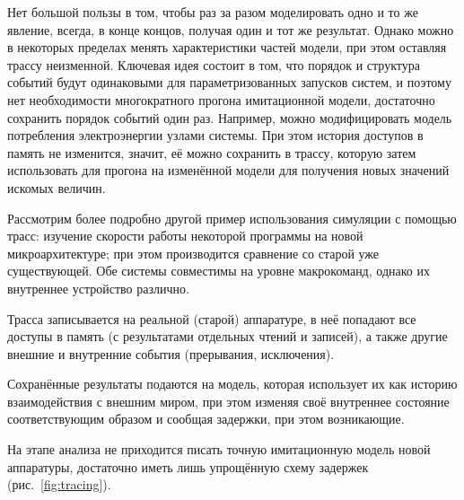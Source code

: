 Нет большой пользы в том, чтобы раз за разом моделировать одно и то же явление, всегда, в конце концов, получая один и тот же результат. Однако можно в некоторых пределах менять характеристики частей модели, при этом оставляя трассу неизменной. Ключевая идея состоит в том, что порядок и структура событий будут одинаковыми для параметризованных запусков систем, и поэтому нет необходимости многократного прогона имитационной модели, достаточно сохранить порядок событий один раз. Например, можно модифицировать модель потребления электроэнергии узлами системы. При этом история доступов в память не изменится, значит, её можно сохранить в трассу, которую затем использовать для прогона на изменённой модели для получения новых значений искомых величин.

Рассмотрим более подробно другой пример использования  симуляции с помощью трасс: изучение скорости работы некоторой программы на новой микроархитектуре; при этом производится сравнение со старой уже существующей. Обе системы совместимы на уровне макрокоманд, однако их внутреннее устройство различно. 

\begin{enumerate*}
    \item Трасса записывается на реальной (старой) аппаратуре, в неё попадают все доступы в память (с результатами отдельных чтений и записей), а также другие внешние и внутренние события (прерывания, исключения). 
    \item Сохранённые результаты подаются на модель, которая использует их как историю взаимодействия с внешним миром, при этом изменяя своё внутреннее состояние соответствующим образом и сообщая задержки, при этом возникающие. 
    \item На этапе анализа не приходится писать точную имитационную модель новой аппаратуры, достаточно иметь лишь упрощённую схему задержек (рис.~\ref{fig:tracing}).
\end{enumerate*}

